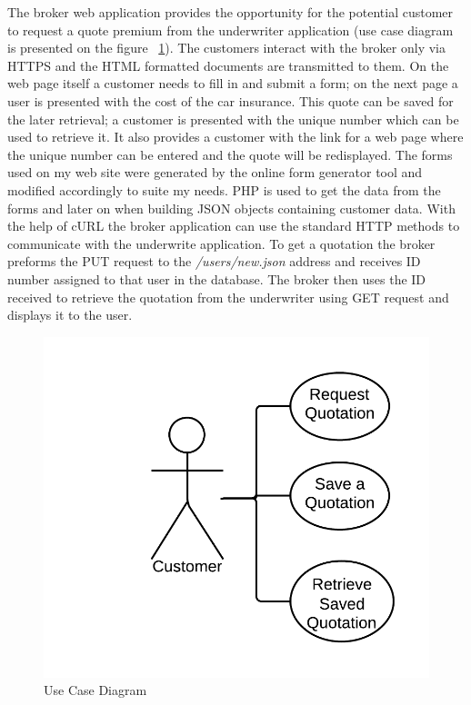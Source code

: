 \documentclass[10pt,a4paper,headinclude=true,twoside]{report}
\begin{document}
The broker web application provides the opportunity for the potential customer to request a quote premium from the underwriter application (use case diagram is presented on the figure ~\ref{fig:usecase}). The customers interact with the broker only via HTTPS and the HTML formatted documents are transmitted to them. On the web page itself a customer needs to fill in and submit a form; on the next page a user is presented with the cost of the car insurance. This quote can be saved for the later retrieval; a customer is presented with the unique number which can be used to retrieve it. It also provides a customer with the link for a web page where the unique number can be entered and the quote will be redisplayed. The forms used on my web site were generated by the online form generator tool and modified accordingly to suite my needs. PHP is used to get the data from the forms and later on when building JSON objects containing customer data. With the help of cURL the broker application can use the standard HTTP methods to communicate with the underwrite application. To get a quotation the broker preforms the PUT request to the \textit{/users/new.json} address and receives ID number assigned to that user in the database. The broker then uses the ID received to retrieve the quotation from the underwriter using GET request and displays it to the user.

\begin{figure}[H]
\centering
\centerline{\includegraphics[scale=0.25]{./usecase}}
\caption{Use Case Diagram}
\label{fig:usecase}
\end{figure} 
\end{document}

